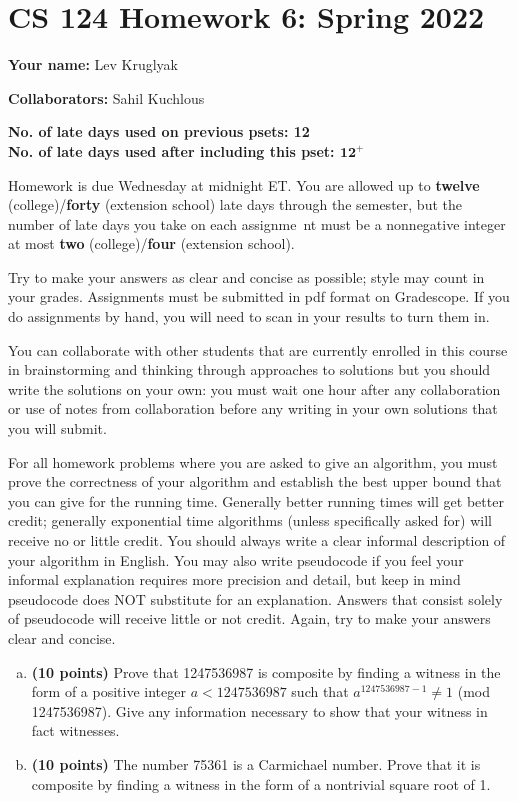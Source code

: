 \documentclass[11pt,letterpaper]{article}
\begin{document}
\section*{CS 124 Homework 6: Spring 2022}

\textbf{Your name:} Lev Kruglyak

\textbf{Collaborators:} Sahil Kuchlous

\textbf{No. of late days used on previous psets: 12}\\
\textbf{No. of late days used after including this pset: $\textbf{12}^+$}

Homework is due Wednesday at midnight ET. You are allowed up to {\bf twelve} (college)/{\bf forty} (extension school) late days through the semester, but the number of late days you take on each assignme\
nt must be a nonnegative integer at most {\bf two} (college)/{\bf four} (extension school).

Try to make your answers as clear and concise as possible;
style may count in your grades. Assignments must be submitted in pdf format on Gradescope. If you do assignments by hand, you will need to scan in your results to turn them in.

You can collaborate with other students that are currently enrolled in this
course in brainstorming and thinking through approaches to solutions but you should write
the solutions on your own: you must wait one hour after any collaboration or use of notes
from collaboration before any writing in your own solutions that you will submit. 

For all homework problems where you are asked to give an algorithm, you must prove the correctness
of your algorithm and establish the best upper bound that you can give for the running time. Generally
better running times will get better credit; generally exponential time algorithms (unless specifically asked
for) will receive no or little credit. You should always write a clear informal description of your algorithm
in English. You may also write pseudocode if you feel your informal explanation requires more precision
and detail, but keep in mind pseudocode does NOT substitute for an explanation. Answers that consist
solely of pseudocode will receive little or not credit. Again, try to make your answers clear and concise.

\pagebreak
\begin{problem}\noindent
    \begin{enumerate}[(a)]
        \item {\bf (10 points)} Prove that 1247536987 is composite by finding a witness in the form of a positive integer $a < 1247536987$ such that $a^{1247536987-1} \neq 1$ (mod 1247536987). Give any information necessary to show that your witness in fact witnesses.  
        \item {\bf (10 points)} The number 75361 is a Carmichael number.  Prove that it is composite by finding a witness in the form of a nontrivial square root of 1. 
    \end{enumerate}
\end{problem}
\end{document}

